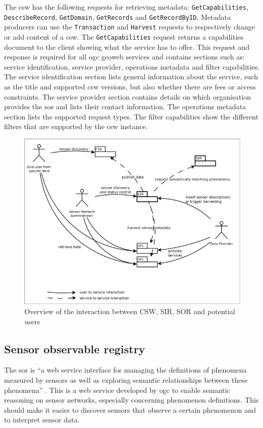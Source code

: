  \begin{sloppypar}
 The \ac{csw} has the following requests for retrieving metadata: \texttt{GetCapabilities},  \texttt{DescribeRecord}, \texttt{GetDomain}, \texttt{GetRecords} and \texttt{GetRecordByID}. Metadata producers can use the \texttt{Transaction} and \texttt{Harvest} requests to respectively change or add content of a \ac{csw}. The \texttt{GetCapabilities} request returns a capabilities document to the client showing what the service has to offer. This request and response is required for all \ac{ogc} geoweb services and contains sections such as: service identification, service provider, operations metadata and filter capabilities. The service identification section lists general information about the service, such as the title and supported \ac{csw} versions, but also whether there are fees or access constraints. The service provider section contains details on which organisation provides the \ac{sos} and lists their contact information. The operations metadata section lists the supported request types. The filter capabilities show the different filters that are supported by the \ac{csw} instance. 
\end{sloppypar}



\begin{figure}
	\centering
	\includegraphics[width=0.8\linewidth]{figs/sor_sir.png}
	\caption{Overview of the interaction between CSW, SIR, SOR and potential users \citep{SW:52North2}}
	\label{fig:SorSir}
\end{figure}

\subsection{Sensor observable registry}
The \ac{sor} is \enquote{a web service interface for managing the definitions of phenomena measured by sensors as well as exploring semantic relationships between these phenomena} \cite[p. vi]{SW:OGC4}. This is a web service developed by \ac{ogc} to enable semantic reasoning on sensor networks, especially concerning phenomenon definitions. This should make it easier to discover sensors that observe a certain phenomenon and to interpret sensor data.

